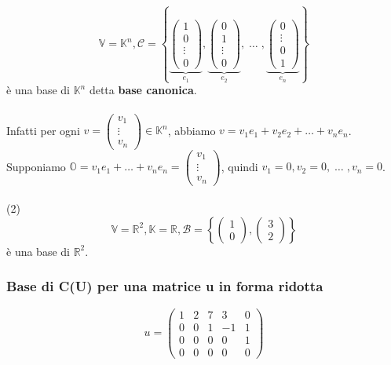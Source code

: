 \documentclass[12pt]{article}
\begin{document}
\[\mathbb{V} = \mathbb{K}^n, \mathcal{C} = \left\{
\underbrace{\begin{pmatrix}
    1\\
    0\\
    \vdots\\
    0
\end{pmatrix}}_{e_1}, \underbrace{\begin{pmatrix}
    0\\
    1\\
    \vdots\\
    0
\end{pmatrix}}_{e_2}, \; \dots \;, \underbrace{\begin{pmatrix}
    0\\
    \vdots\\
    0\\
    1
\end{pmatrix}}_{e_n}\right\}\]
è una base di $\mathbb{K}^n$ detta \textbf{base canonica}.\\\\
Infatti per ogni $v = \begin{pmatrix}
    v_1\\
    \vdots\\
    v_n
\end{pmatrix} \in \mathbb{K}^n$, abbiamo $v = v_1e_1 + v_2e_2 + \dots + v_ne_n$.\\
Supponiamo $\mathbb{O} =  v_1e_1  + \dots + v_ne_n = \begin{pmatrix}
    v_1\\
    \vdots\\
    v_n
\end{pmatrix}$, quindi $v_1 = 0, v_2 = 0, \; \dots \;, v_n = 0$.
\\\\
(2)
\[\mathbb{V} = \mathbb{R}^2, \mathbb{K} = \mathbb{R}, \mathcal{B} = \left\{\begin{pmatrix}
    1\\
    0
\end{pmatrix}, \begin{pmatrix}
    3\\
    2
\end{pmatrix}  \right\}\]
è una base di $\mathbb{R}^2$.

\subsubsection{Base di C(U) per una matrice u in forma ridotta}

\[u = \begin{pmatrix}
    1 & 2 & 7 & 3 & 0\\
    0 & 0 & 1 & -1 & 1\\
    0 & 0 & 0 & 0 & 1\\
    0 & 0 & 0 & 0 & 0
\end{pmatrix}\]
\end{document}
